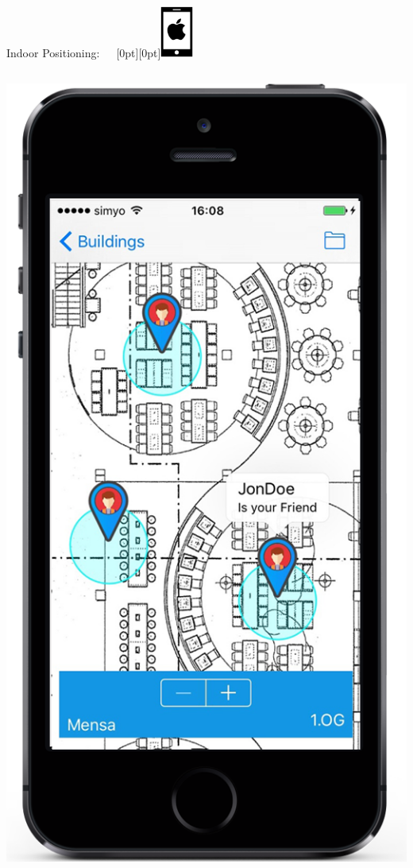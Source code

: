 \documentclass[11pt]{beamer}
\begin{document}
\begin{frame}{Indoor Positioning:~~~\raisebox{-10pt}[0pt][0pt]{\includegraphics[width=0.08\textwidth]{tech-stack-apple}}}
\begin{columns}[T]
\begin{column}{.4\textwidth}
  \includegraphics[scale=0.25]{mappinpointc}
  \end{column}
\end{columns}

\end{frame}
\end{document}
